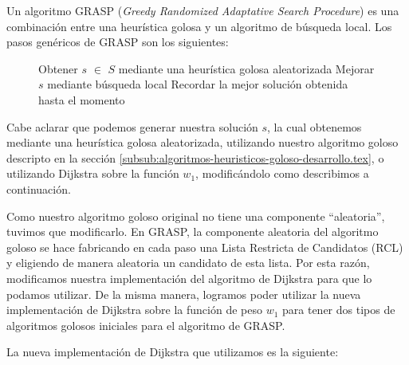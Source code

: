 Un algoritmo GRASP (\emph{Greedy Randomized Adaptative Search Procedure}) es una combinación entre una heurística golosa y un algoritmo de búsqueda local. Los pasos genéricos de GRASP son los siguientes:

\begin{center}
 \begin{figure}[H]
  \begin{pseudo}
    \State Obtener $s$ $\in$ $S$ mediante una heurística golosa aleatorizada
    \State Mejorar $s$ mediante búsqueda local
    \State Recordar la mejor solución obtenida hasta el momento
    \EndWhile
    \EndProcedure
  \end{pseudo}
 \end{figure}
\end{center}

Cabe aclarar que podemos generar nuestra solución $s$, la cual obtenemos mediante una heurística golosa aleatorizada, utilizando nuestro algoritmo goloso descripto en la sección \ref{subsub:algoritmos-heuristicos-goloso-desarrollo.tex}, o utilizando Dijkstra sobre la función $w_1$, modificándolo como describimos a continuación.

Como nuestro algoritmo goloso original no tiene una componente ``aleatoria'', tuvimos que modificarlo. En GRASP, la componente aleatoria del algoritmo goloso se hace  fabricando en cada paso una Lista Restricta de Candidatos (RCL) y eligiendo de manera aleatoria un candidato de esta lista. Por esta razón, modificamos nuestra implementación del algoritmo de Dijkstra para que lo podamos utilizar. De la misma manera, logramos poder utilizar la nueva implementación de Dijkstra sobre la función de peso $w_1$ para tener dos tipos de algoritmos golosos iniciales para el algoritmo de GRASP.

La nueva implementación de Dijkstra que utilizamos es la siguiente:

